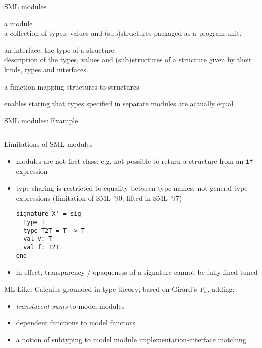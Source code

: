 \documentclass{beamer}
\begin{document}
\begin{frame}{SML modules}
\begin{description}
\item[structure] a module\\a collection of types, values and
  (sub)structures packaged as a program unit.
\item[signature] an interface; the type of a structure\\description of
  the types, values and (sub)structures of a structure given by their
  kinds, types and interfaces.
\item[functor] a function mapping structures to structures
\item[type-sharing] enables stating that types specified in separate
  modules are actually equal
\end{description}
\end{frame}

\begin{frame}[fragile]{SML modules: Example}
\inputminted[fontsize=\footnotesize]{sml}{intro.sml}
\end{frame}

\begin{frame}[fragile]{Limitations of SML modules}
\begin{itemize}
\item modules are not first-class; e.g. not possible to return a
  structure from an {\tt if} expression
\item type sharing is restricted to equality between type names, not
  general type expressions (limitation of SML '90; lifted in SML '97)
\begin{verbatim}
signature X' = sig
  type T
  type T2T = T -> T
  val v: T
  val f: T2T
end
\end{verbatim}
\item in effect, transparency / opaqueness of a signature cannot be
  fully fined-tuned
\end{itemize}
\end{frame}

\begin{frame}{ML-Like: Calculus}
grounded in type theory; based on Girard's $F_\omega$, adding:
\begin{itemize}
\item {\it translucent sums} to model modules
\item dependent functions to model functors
\item a notion of subtyping to model module implementation-interface matching
\end{itemize}
\end{frame}
\end{document}
